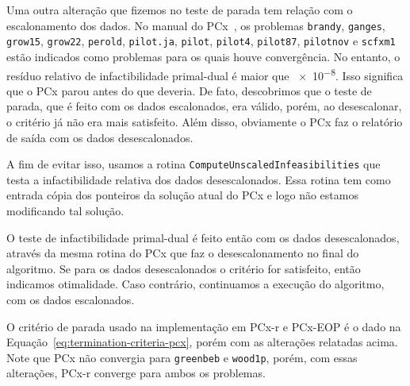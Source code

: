 Uma outra alteração  que fizemos no teste de parada tem relação com o escalonamento dos dados. No manual do PCx~\cite[p. 20]{Czyzyk:1998vw},  os problemas \texttt{brandy}, \texttt{ganges}, \texttt{grow15}, \texttt{grow22}, \texttt{perold}, \texttt{pilot.ja}, \texttt{pilot}, \texttt{pilot4}, \texttt{pilot87}, \texttt{pilotnov} e \texttt{scfxm1} estão indicados como problemas para os quais houve convergência. No entanto, o resíduo relativo de infactibilidade primal-dual é maior que \num{e-8}. Isso significa que o PCx parou antes do que deveria. De fato, descobrimos que  o teste de parada, que é feito com os dados escalonados, era válido, porém, ao desescalonar, o critério já não era mais satisfeito. Além disso, obviamente o PCx faz o relatório de saída com os dados desescalonados. 

A fim de evitar isso, usamos a rotina \verb|ComputeUnscaledInfeasibilities| que testa a infactibilidade relativa dos dados desescalonados. Essa rotina tem como entrada cópia dos ponteiros da solução atual do PCx e logo não estamos modificando tal solução. 

O teste de infactibilidade primal-dual é feito então com os dados desescalonados, através da mesma rotina do PCx que  faz o desescalonamento no final do algoritmo. Se para os dados desescalonados o critério for satisfeito, então indicamos otimalidade. Caso contrário, continuamos a execução do algoritmo, com os dados escalonados. 


O critério de parada usado  na implementação em PCx-r e PCx-EOP é o dado na Equação~\eqref{eq:termination-criteria-pcx}, porém com  as alterações relatadas acima. Note que PCx não convergia para \texttt{greenbeb} e \texttt{wood1p}, porém, com essas alterações, PCx-r converge para ambos os problemas. 









